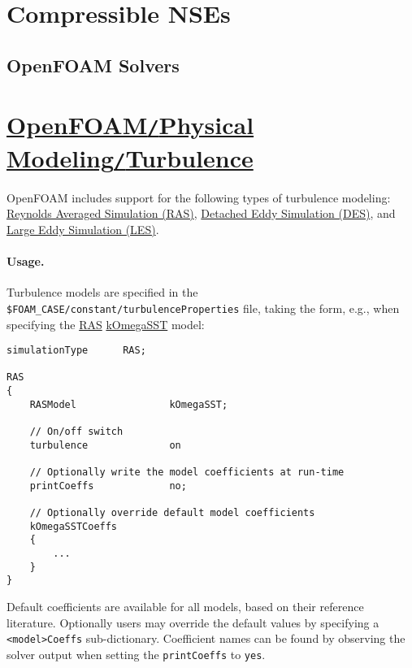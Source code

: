 \documentclass{article}
\numberwithin{equation}{section}
\begin{document}
\section{Compressible NSEs}

\subsection{OpenFOAM Solvers}

\section{\href{https://www.openfoam.com/documentation/guides/latest/doc/guide-turbulence.html}{OpenFOAM\texttt{/}Physical Modeling\texttt{/}Turbulence}}
OpenFOAM includes support for the following types of turbulence modeling: \href{https://www.openfoam.com/documentation/guides/latest/doc/guide-turbulence-ras.html}{Reynolds Averaged Simulation (RAS)}, \href{https://www.openfoam.com/documentation/guides/latest/doc/guide-turbulence-des.html}{Detached Eddy Simulation (DES)}, and \href{https://www.openfoam.com/documentation/guides/latest/doc/guide-turbulence-les.html}{Large Eddy Simulation (LES)}.

\paragraph{Usage.} Turbulence models are specified in the \verb|$FOAM_CASE/constant/turbulenceProperties| file, taking the form, e.g., when specifying the \href{https://www.openfoam.com/documentation/guides/latest/doc/guide-turbulence-ras.html}{RAS} \href{https://www.openfoam.com/documentation/guides/latest/doc/guide-turbulence-ras-k-omega-sst.html}{kOmegaSST} model:
\begin{verbatim}
simulationType      RAS;

RAS
{
    RASModel                kOmegaSST;

    // On/off switch
    turbulence              on

    // Optionally write the model coefficients at run-time
    printCoeffs             no;

    // Optionally override default model coefficients
    kOmegaSSTCoeffs
    {
        ...
    }
}
\end{verbatim}
Default coefficients are available for all models, based on their reference literature. Optionally users may override the default values by specifying a \verb|<model>Coeffs| sub-dictionary. Coefficient names can be found by observing the solver output when setting the \texttt{printCoeffs} to \texttt{yes}.
\end{document}
